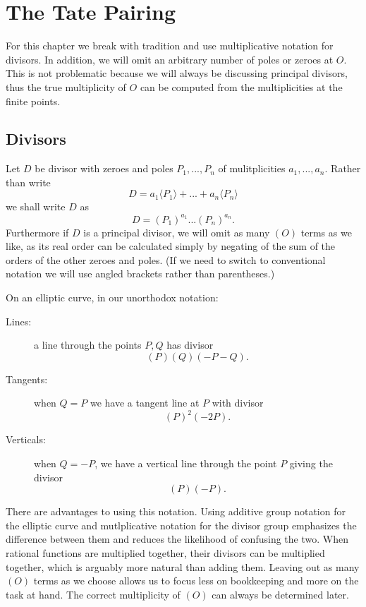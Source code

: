 \chapter {The Tate Pairing}

For this chapter we break with tradition and use multiplicative
notation for divisors. In addition, we will omit an arbitrary
number of poles or zeroes at $O$. This is not problematic because we
will always be discussing principal divisors, thus the true multiplicity
of $O$ can be computed from the multiplicities at the finite points.

\section {Divisors}

Let $D$ be divisor with zeroes and poles $P_1,...,P_n$ of mulitplicities
$a_1,...,a_n$. Rather than write
\[ D = a_1\langle P_1\rangle + ... + a_n \langle P_n\rangle \]
we shall write $D$ as
\[ D = (P_1)^{a_1} ... (P_n)^{a_n} . \]
Furthermore if $D$ is a principal divisor, we will
omit as many $(O)$ terms as we like, as its real order
can be calculated simply by negating
of the sum of the orders of the other zeroes and poles.
(If we need to switch to conventional notation we will use angled brackets
rather than parentheses.)

On an elliptic curve, in our unorthodox notation:
\begin{description}
\item[Lines:]
a line through the points $P, Q$ has divisor
\[ (P)(Q)(-P-Q) . \]
\item[Tangents:]
when $Q = P$ we have a tangent line at $P$ with divisor
\[ (P)^2 (-2P) . \]
\item[Verticals:]
when $Q = -P$, we have a vertical line through the point $P$
giving the divisor
\[ (P)(-P) . \]
\end{description}

There are advantages to using this notation. Using additive group
notation for the elliptic curve and mutlplicative notation for the divisor
group emphasizes the difference between them and reduces the likelihood of
confusing the two. When rational functions are multiplied together,
their divisors can be multiplied together, which is arguably
more natural than adding them.
Leaving out as many $(O)$ terms as we choose allows us to focus less on
bookkeeping and more on the task at hand.
The correct multiplicity of $(O)$ can always be determined later.

